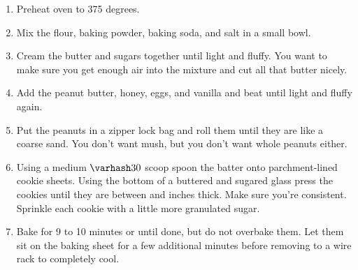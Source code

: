\documentclass{article}
\begin{document}
\begin{enumerate}
      \item Preheat oven to 375 degrees.
      \item Mix the flour, baking powder, baking soda, and salt in a small bowl.
      \item Cream the butter and sugars together until light and fluffy. You want to make sure you get
            enough air into the mixture and cut all that butter nicely.
      \item Add the peanut butter, honey, eggs, and vanilla and beat until light and fluffy again.
      \item Put the peanuts in a zipper lock bag and roll them until they are like a coarse sand. You
            don't want mush, but you don't want whole peanuts either.
      \item Using a medium $\varhash 30$ scoop spoon the batter onto parchment-lined cookie sheets. Using
            the bottom of a buttered and sugared glass press the cookies until they are between 
            and  inches thick. Make sure you're consistent. Sprinkle each cookie with a little
            more granulated sugar.
      \item Bake for 9 to 10 minutes or until done, but do not overbake them. Let them sit on the baking
            sheet for a few additional minutes before removing to a wire rack to completely cool.
\end{enumerate}


\end{document}
